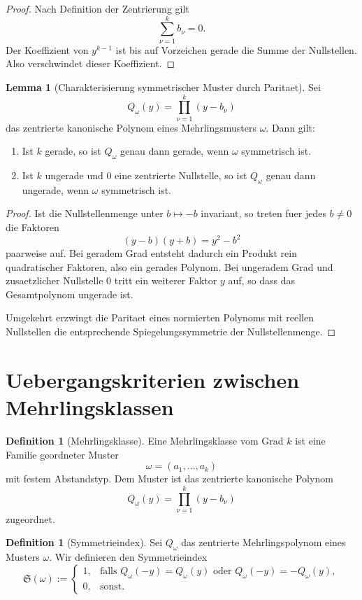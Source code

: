 \documentclass[11pt,a4paper]{article}
\theoremstyle{definition}
\newtheorem{lemma}[satz]{Lemma}
\newtheorem{definition}[satz]{Definition}
\begin{document}
\begin{proof}
Nach Definition der Zentrierung gilt
\[
\sum_{\nu=1}^k b_\nu=0.
\]
Der Koeffizient von \(y^{k-1}\) ist bis auf Vorzeichen gerade die Summe der Nullstellen. Also verschwindet dieser Koeffizient.
\end{proof}

\begin{lemma}[Charakterisierung symmetrischer Muster durch Paritaet]
Sei
\[
Q_\omega(y)=\prod_{\nu=1}^k (y-b_\nu)
\]
das zentrierte kanonische Polynom eines Mehrlingsmusters \(\omega\).
Dann gilt:
\begin{enumerate}[leftmargin=2em]
\item Ist \(k\) gerade, so ist \(Q_\omega\) genau dann gerade, wenn \(\omega\) symmetrisch ist.
\item Ist \(k\) ungerade und \(0\) eine zentrierte Nullstelle, so ist \(Q_\omega\) genau dann ungerade, wenn \(\omega\) symmetrisch ist.
\end{enumerate}
\end{lemma}

\begin{proof}
Ist die Nullstellenmenge unter \(b\mapsto -b\) invariant, so treten fuer jedes \(b\neq 0\) die Faktoren
\[
(y-b)(y+b)=y^2-b^2
\]
paarweise auf. Bei geradem Grad entsteht dadurch ein Produkt rein quadratischer Faktoren, also ein gerades Polynom. Bei ungeradem Grad und zusaetzlicher Nullstelle \(0\) tritt ein weiterer Faktor \(y\) auf, so dass das Gesamtpolynom ungerade ist.

Umgekehrt erzwingt die Paritaet eines normierten Polynoms mit reellen Nullstellen die entsprechende Spiegelungssymmetrie der Nullstellenmenge.
\end{proof}

\section{Uebergangskriterien zwischen Mehrlingsklassen}

\begin{definition}[Mehrlingsklasse]
Eine Mehrlingsklasse vom Grad \(k\) ist eine Familie geordneter Muster
\[
\omega=(a_1,\dots,a_k)
\]
mit festem Abstandstyp. Dem Muster ist das zentrierte kanonische Polynom
\[
Q_\omega(y)=\prod_{\nu=1}^k (y-b_\nu)
\]
zugeordnet.
\end{definition}

\begin{definition}[Symmetrieindex]
Sei \(Q_\omega\) das zentrierte Mehrlingspolynom eines Musters \(\omega\). Wir definieren den Symmetrieindex
\[
\mathfrak S(\omega):=
\begin{cases}
1,& \text{falls } Q_\omega(-y)=Q_\omega(y)\text{ oder }Q_\omega(-y)=-Q_\omega(y),\\
0,& \text{sonst.}
\end{cases}
\]
\end{definition}
\end{document}

